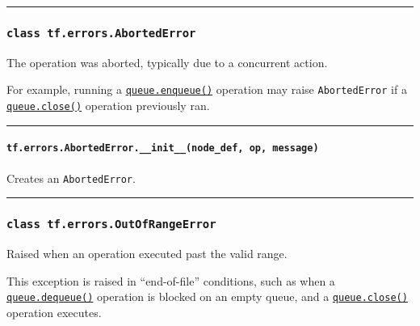\begin{center}\rule{0.5\linewidth}{\linethickness}\end{center}

\subsubsection{\texorpdfstring{\texttt{class\ tf.errors.AbortedError}
}{class tf.errors.AbortedError }}\label{class-tf.errors.abortederror}

The operation was aborted, typically due to a concurrent action.

For example, running a
\href{../../api_docs/python/io_ops.md\#QueueBase.enqueue}{\texttt{queue.enqueue()}}
operation may raise \texttt{AbortedError} if a
\href{../../api_docs/python/io_ops.md\#QueueBase.close}{\texttt{queue.close()}}
operation previously ran.

\begin{center}\rule{0.5\linewidth}{\linethickness}\end{center}

\paragraph{\texorpdfstring{\texttt{tf.errors.AbortedError.\_\_init\_\_(node\_def,\ op,\ message)}
}{tf.errors.AbortedError.\_\_init\_\_(node\_def, op, message) }}\label{tf.errors.abortederror.ux5fux5finitux5fux5fnodeux5fdef-op-message}

Creates an \texttt{AbortedError}.

\begin{center}\rule{0.5\linewidth}{\linethickness}\end{center}

\subsubsection{\texorpdfstring{\texttt{class\ tf.errors.OutOfRangeError}
}{class tf.errors.OutOfRangeError }}\label{class-tf.errors.outofrangeerror}

Raised when an operation executed past the valid range.

This exception is raised in ``end-of-file'' conditions, such as when a
\href{../../api_docs/python/io_ops.md\#QueueBase.dequeue}{\texttt{queue.dequeue()}}
operation is blocked on an empty queue, and a
\href{../../api_docs/python/io_ops.md\#QueueBase.close}{\texttt{queue.close()}}
operation executes.

